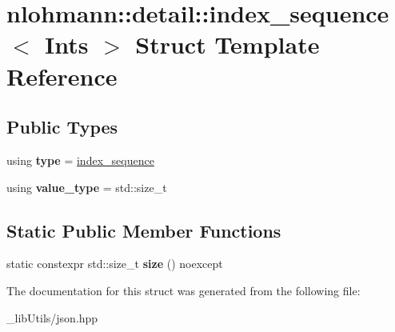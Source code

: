 \hypertarget{structnlohmann_1_1detail_1_1index__sequence}{}\section{nlohmann\+:\+:detail\+:\+:index\+\_\+sequence$<$ Ints $>$ Struct Template Reference}
\label{structnlohmann_1_1detail_1_1index__sequence}
\subsection*{Public Types}
\begin{DoxyCompactItemize}
\item 
using {\bfseries type} = \hyperlink{structnlohmann_1_1detail_1_1index__sequence}{index\+\_\+sequence}\hypertarget{structnlohmann_1_1detail_1_1index__sequence_a3c14c4ab277de72b166806193ff4fa10}{}\label{structnlohmann_1_1detail_1_1index__sequence_a3c14c4ab277de72b166806193ff4fa10}

\item 
using {\bfseries value\+\_\+type} = std\+::size\+\_\+t\hypertarget{structnlohmann_1_1detail_1_1index__sequence_a2eca43d08fc1eb68bd5fa75b6714d21d}{}\label{structnlohmann_1_1detail_1_1index__sequence_a2eca43d08fc1eb68bd5fa75b6714d21d}

\end{DoxyCompactItemize}
\subsection*{Static Public Member Functions}
\begin{DoxyCompactItemize}
\item 
static constexpr std\+::size\+\_\+t {\bfseries size} () noexcept\hypertarget{structnlohmann_1_1detail_1_1index__sequence_a7ac529419787d775f52408135304b337}{}\label{structnlohmann_1_1detail_1_1index__sequence_a7ac529419787d775f52408135304b337}

\end{DoxyCompactItemize}


The documentation for this struct was generated from the following file\+:\begin{DoxyCompactItemize}
\item 
\+\_\+lib\+Utils/json.\+hpp\end{DoxyCompactItemize}
